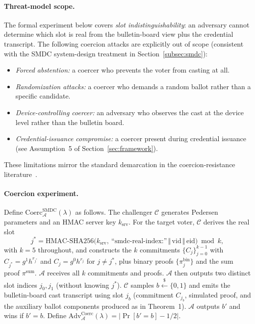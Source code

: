 \paragraph{Threat-model scope.} The formal experiment below covers \emph{slot indistinguishability}: an adversary cannot determine which slot is real from the bulletin-board view plus the credential transcript. The following coercion attacks are explicitly out of scope (consistent with the SMDC system-design treatment in Section~\ref{subsec:smdc}):
\begin{itemize}
    \item \emph{Forced abstention:} a coercer who prevents the voter from casting at all.
    \item \emph{Randomization attacks:} a coercer who demands a random ballot rather than a specific candidate.
    \item \emph{Device-controlling coercer:} an adversary who observes the cast at the device level rather than the bulletin board.
    \item \emph{Credential-issuance compromise:} a coercer present during credential issuance (see Assumption~5 of Section~\ref{sec:framework}).
\end{itemize}
These limitations mirror the standard demarcation in the coercion-resistance literature~\cite{jcj2005}.

\paragraph{Coercion experiment.} Define $\mathrm{Coerc}^{\mathrm{SMDC}}_{\mathcal{A}}(\lambda)$ as follows. The challenger $\mathcal{C}$ generates Pedersen parameters and an HMAC server key $k_{\mathrm{srv}}$. For the target voter, $\mathcal{C}$ derives the real slot
\begin{equation*}
    j^* = \mathrm{HMAC\text{-}SHA256}\bigl(k_{\mathrm{srv}},\ \text{``smdc-real-index:''} \,\Vert\, \mathrm{vid} \,\Vert\, \mathrm{eid}\bigr) \bmod k,
\end{equation*}
with $k = 5$ throughout, and constructs the $k$ commitments $\{C_j\}_{j=0}^{k-1}$ with $C_{j^*} = g^1 h^{r_{j^*}}$ and $C_j = g^0 h^{r_j}$ for $j \neq j^*$, plus binary proofs $\{\pi_j^{\text{bin}}\}$ and the sum proof $\pi^{\text{sum}}$. $\mathcal{A}$ receives all $k$ commitments and proofs. $\mathcal{A}$ then outputs two distinct slot indices $j_0, j_1$ (without knowing $j^*$). $\mathcal{C}$ samples $b \stackrel{\$}{\leftarrow} \{0,1\}$ and emits the bulletin-board cast transcript using slot $j_b$ (commitment $C_{j_b}$, simulated proof, and the auxiliary ballot components produced as in Theorem~1). $\mathcal{A}$ outputs $b'$ and wins if $b' = b$. Define $\mathrm{Adv}^{\mathrm{Coerc}}_{\mathcal{A}}(\lambda) = |\Pr[b' = b] - 1/2|$.

